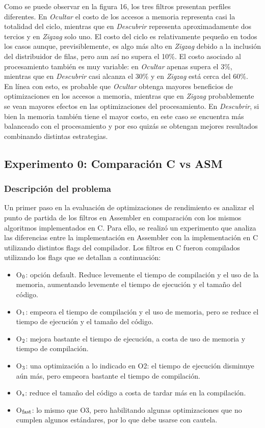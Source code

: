 \documentclass[a4paper]{article}
\begin{document}
Como se puede observar en la figura 16, los tres filtros presentan perfiles diferentes. En \textit{Ocultar} el costo de los accesos a memoria representa casi la totalidad del ciclo, mientras que en \textit{Descubrir} representa aproximadamente dos tercios y en \textit{Zigzag} solo uno. El costo del ciclo es relativamente pequeño en todos los casos aunque, previsiblemente, es algo más alto en \textit{Zigzag} debido a la inclusión del distribuidor de filas, pero aun así no supera el 10\%. El costo asociado al procesamiento también es muy variable: en \textit{Ocultar} apenas supera el 3\%, mientras que en \textit{Descubrir} casi alcanza el 30\% y en \textit{Zigzag} está cerca del 60\%.
\\ En línea con esto, es probable que \textit{Ocultar} obtenga mayores beneficios de optimizaciones en los accesos a memoria, mientras que en \textit{Zigzag} probablemente se vean mayores efectos en las optimizaciones del procesamiento. En \textit{Descubrir}, si bien la memoria también tiene el mayor costo, en este caso se encuentra más balanceado con el procesamiento y por eso quizás se obtengan mejores resultados combinando distintas estrategias.

\subsection{Experimento 0: Comparación C vs ASM}
\subsubsection{Descripción del problema}
Un primer paso en la evaluación de optimizaciones de rendimiento es analizar el punto de partida de los filtros en Assembler en comparación con los mismos algoritmos implementados en C. Para ello, se realizó un experimento que analiza las diferencias entre la implementación en Assembler con la implementación en C utilizando distintos flags del compilador. Los filtros en C fueron compilados utilizando los flags que se detallan a continuación:

\begin{itemize}
\item O$\textsubscript{0}$: opción default. Reduce levemente el tiempo de compilación y el uso de la memoria, aumentando levemente el tiempo de ejecución y el tamaño del código.
\item O$\textsubscript{1}$: empeora el tiempo de compilación y el uso de memoria, pero se reduce el tiempo de ejecución y el tamaño del código.
\item O$\textsubscript{2}$: mejora bastante el tiempo de ejecución, a costa de uso de memoria y tiempo de compilación.
\item O$\textsubscript{3}$: una optimización a lo indicado en O2: el tiempo de ejecución disminuye aún más, pero empeora bastante el tiempo de compilación.
\item O$\textsubscript{s}$: reduce el tamaño del código a costa de tardar más en la compilación.
\item O$\textsubscript{fast}$: lo mismo que O3, pero habilitando algunas optimizaciones que no cumplen algunos estándares, por lo que debe usarse con cautela.
\end{itemize}
\end{document}
